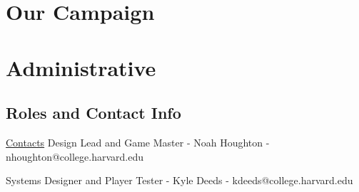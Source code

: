 \documentclass[letterpaper,10pt,twoside,twocolumn,openany]{dndbook}
\begin{document}
\part{Our Campaign}


\part{Administrative}
\chapter{Roles and Contact Info} \label{contact}
\hyperlink{contact}{Contacts}
Design Lead and Game Master - Noah Houghton - nhoughton@college.harvard.edu

Systems Designer and Player Tester - Kyle Deeds - kdeeds@college.harvard.edu
\end{document}
